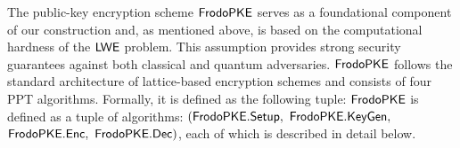 \documentclass{fundam}
\begin{document}
The public-key encryption scheme $\mathsf{FrodoPKE}$ serves as a foundational component of our construction and, as mentioned above, is based on the computational hardness of the $\mathsf{LWE}$ problem. This assumption provides strong security guarantees against both classical and quantum adversaries. $\mathsf{FrodoPKE}$ follows the standard architecture of lattice-based encryption schemes and consists of four PPT algorithms. Formally, it is defined as the following tuple: $\mathsf{FrodoPKE}$ is defined as a tuple of algorithms: $(\tx{FrodoPKE.Setup},\ \tx{FrodoPKE.KeyGen},$ $\mathsf{FrodoPKE.Enc},\ \mathsf{FrodoPKE.Dec})$,
each of which is described in detail below.


\vspace{0.5cm}
 \begin{pchstack}[center]
	
	\begin{pcvstack}
		
		
		\pcvspace
		
		
		
	\end{pcvstack}
	
	\pchspace
	
	\begin{pcvstack}
		~~~~~
     \end{pcvstack}	
		
	\pchspace	
	
	\begin{pcvstack}
	
	
	\pcvspace  
	
\end{pcvstack}	
\end{pchstack}	
\end{document}

